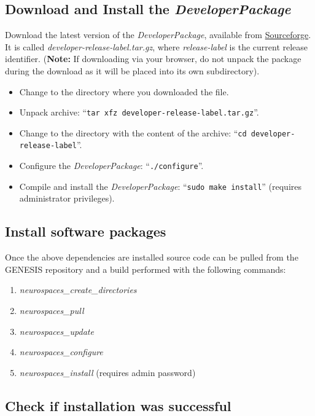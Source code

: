 \documentclass[12pt]{article}
\begin{document}
\subsection*{Download and Install the {\it DeveloperPackage}}

Download the latest version of the {\it DeveloperPackage}, available from \href{http://sourceforge.net/projects/neurospaces/files/}{Sourceforge}.  It is called {\it developer-release-label.tar.gz}, where {\it release-label} is the current release identifier. ({\bf Note:} If downloading via your browser, do not unpack the package during the download as it will be placed into its own subdirectory).
\begin{itemize}
   \item[] Change to the directory where you downloaded the file.
   \item[] Unpack archive: ``{\tt tar xfz developer-release-label.tar.gz}''.
   \item[] Change to the directory with the content of the archive: ``{\tt cd developer-release-label}''.
   \item[] Configure the {\it DeveloperPackage}: ``{\tt ./configure}''.
   \item[] Compile and install the {\it DeveloperPackage}: ``{\tt sudo make install}'' (requires administrator privileges).
\end{itemize}

\subsection*{Install software packages}

Once the above dependencies are installed source code can be pulled from the GENESIS repository and a build performed with the following commands:
\begin{enumerate}
   \item{\it neurospaces\_create\_directories}
   \item{\it neurospaces\_pull}
   \item{\it neurospaces\_update}
   \item{\it neurospaces\_configure}
   \item{\it neurospaces\_install} (requires admin password) 
\end{enumerate}

\subsection*{Check if installation was successful}
\end{document}
